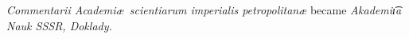 {\it Commentarii Academi\ae\ scientiarum imperialis petropolitan\ae} became {\it Akademi\t{\i a} Nauk SSSR, Doklady.}
